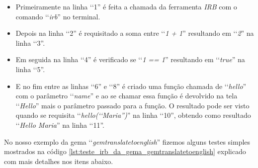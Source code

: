 \begin{itemize}

 
  \item Primeiramente na linha ‘‘1'' é feita a chamada da ferramenta \emph{IRB} com o comando ‘‘\emph{irb}'' 
  no terminal.
 
 \item Depois na linha ‘‘2'' é requisitado a soma entre ‘‘\emph{1 + 1}'' resultando em ‘‘\emph{2}'' na linha 
 ‘‘3''.
 
 \item Em seguida na linha ‘‘4'' é verificado se ‘‘\emph{1 == 1}'' resultando em ‘‘\emph{true}'' na linha 
 ‘‘5''.

 \item E no fim entre as linhas ‘‘6'' e ‘‘8'' é criado uma função chamada de ‘‘\emph{hello}'' com o 
 parâmetro ‘‘\emph{name}'' e ao se chamar essa função é devolvido na tela ‘‘\emph{Hello}'' mais o 
 parâmetro passado para a função. O resultado pode ser visto quando se requisita 
 ‘‘\emph{hello(‘‘Maria'')}'' na linha ‘‘10'', obtendo como resultado ‘‘\emph{Hello Maria}'' na linha ‘‘11''.
 
\end{itemize}

No nosso exemplo da gema ‘‘\emph{gemtranslatetoenglish}'' fizemos alguns testes simples mostrados
na código \ref{lst:teste_irb_da_gema_gemtranslatetoenglish} explicado com mais detalhes nos itens abaixo.

